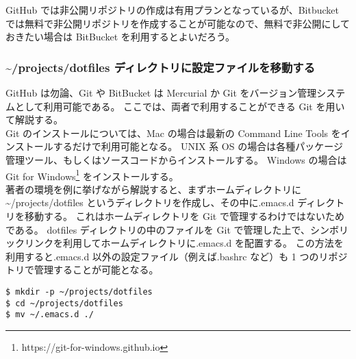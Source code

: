 GitHub では非公開リポジトリの作成は有用プランとなっているが、Bitbucket では無料で非公開リポジトリを作成することが可能なので、無料で非公開にしておきたい場合は BitBucket を利用するとよいだろう。
\subsubsection{\textasciitilde{}/projects/dotfiles ディレクトリに設定ファイルを移動する}
GitHub は勿論、Git や BitBucket は Mercurial か Git をバージョン管理システムとして利用可能である。
ここでは、両者で利用することができる Git を用いて解説する。\\

Git のインストールについては、Mac の場合は最新の Command Line Tools をインストールするだけで利用可能となる。
UNIX 系 OS の場合は各種パッケージ管理ツール、もしくはソースコードからインストールする。
Windows の場合は Git for Windows\footnote{https://git-for-windows.github.io} をインストールする。\\

著者の環境を例に挙げながら解説すると、まずホームディレクトリに \textasciitilde{}/projects/dotfiles というディレクトリを作成し、その中に.emacs.d ディレクトリを移動する。
これはホームディレクトリを Git で管理するわけではないためである。
dotfiles ディレクトリの中のファイルを Git で管理した上で、シンボリックリンクを利用してホームディレクトリに.emacs.d を配置する。
この方法を利用すると.emacs.d 以外の設定ファイル（例えば.bashrc など）も 1 つのリポジトリで管理することが可能となる。
\begin{mdframed}[roundcorner=0.50zw,leftmargin=3.00zw,rightmargin=3.00zw,skipabove=0.40zw,skipbelow=0.40zw,innertopmargin=4.00pt,innerbottommargin=4.00pt,innerleftmargin=5.00pt,innerrightmargin=5.00pt,linecolor=gray!090,linewidth=0.50pt,backgroundcolor=gray!90]\color{gray!10}
\begin{verbatim}
$ mkdir -p ~/projects/dotfiles
$ cd ~/projects/dotfiles
$ mv ~/.emacs.d ./
\end{verbatim}
\end{mdframed}
